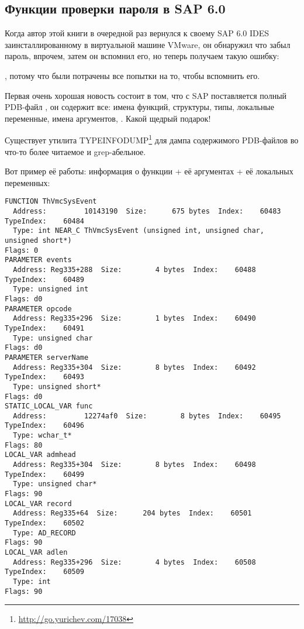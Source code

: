 \subsection{Функции проверки пароля в SAP 6.0}

Когда автор этой книги в очередной раз вернулся к своему SAP 6.0 IDES заинсталлированному в виртуальной машине VMware, он обнаружил что забыл пароль, впрочем, затем он вспомнил его, но теперь получаем такую ошибку:
 
, 
потому что были потрачены все попытки на то, чтобы вспомнить его.

Первая очень хорошая новость состоит в том, что с SAP поставляется полный \gls{PDB}-файл , он содержит все: имена функций, структуры, типы, локальные переменные, имена аргументов, \etc{}. Какой щедрый подарок!

Существует утилита TYPEINFODUMP\footnote{\url{http://go.yurichev.com/17038}} для дампа содержимого \gls{PDB}-файлов во что-то более читаемое и grep-абельное.

Вот пример её работы: информация о функции + её аргументах + её локальных переменных:

\begin{lstlisting}
FUNCTION ThVmcSysEvent 
  Address:         10143190  Size:      675 bytes  Index:    60483  TypeIndex:    60484 
  Type: int NEAR_C ThVmcSysEvent (unsigned int, unsigned char, unsigned short*)
Flags: 0 
PARAMETER events 
  Address: Reg335+288  Size:        4 bytes  Index:    60488  TypeIndex:    60489 
  Type: unsigned int
Flags: d0 
PARAMETER opcode 
  Address: Reg335+296  Size:        1 bytes  Index:    60490  TypeIndex:    60491 
  Type: unsigned char
Flags: d0 
PARAMETER serverName 
  Address: Reg335+304  Size:        8 bytes  Index:    60492  TypeIndex:    60493 
  Type: unsigned short*
Flags: d0 
STATIC_LOCAL_VAR func 
  Address:         12274af0  Size:        8 bytes  Index:    60495  TypeIndex:    60496 
  Type: wchar_t*
Flags: 80 
LOCAL_VAR admhead 
  Address: Reg335+304  Size:        8 bytes  Index:    60498  TypeIndex:    60499 
  Type: unsigned char*
Flags: 90 
LOCAL_VAR record 
  Address: Reg335+64  Size:      204 bytes  Index:    60501  TypeIndex:    60502 
  Type: AD_RECORD
Flags: 90 
LOCAL_VAR adlen 
  Address: Reg335+296  Size:        4 bytes  Index:    60508  TypeIndex:    60509 
  Type: int
Flags: 90 
\end{lstlisting}

